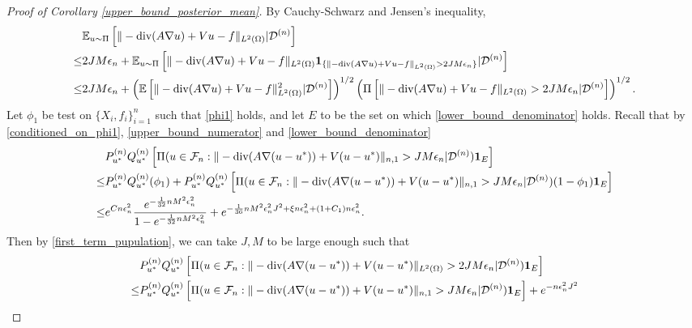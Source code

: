 \documentclass{article}
\newcommand{\E}{\mathbb{E}}
\newcommand{\F}{\mathcal{F}}
\newcommand{\D}{\mathcal{D}}
\renewcommand{\div}{\textnormal{div}}
\theoremstyle{plain}
\theoremstyle{definition}
\theoremstyle{remark}
\begin{document}
\begin{proof}[Proof of Corollary \ref{upper_bound_posterior_mean}]
    By Cauchy-Schwarz and Jensen's inequality, 
    \begin{equation} \label{posterior_mean_upper_bound}
        \begin{aligned}
            & \E_{u \sim \Pi} \left[  \|-\div(A \nabla u) + V u -f\|_{L^2(\Omega)} | \D^{(n)} \right] \\ \leq &  2J M \epsilon_n  + \E_{u \sim \Pi}\left[  \|-\div(A \nabla u) + V u -f\|_{L^2(\Omega)} \mathbf{1}_{\{  \|-\div(A \nabla u) + V u -f\|_{L^2(\Omega)} >2 J M \epsilon_n \}} | \D^{(n)}\right] \\
              \leq & 2J M \epsilon_n + \left(\E \left[ \|-\div(A \nabla u) + V u -f\|_{L^2(\Omega)}^2 | \D^{(n)}\right] \right)^{1/2} \left(\Pi \left[ \|-\div(A \nabla u) + V u -f\|_{L^2(\Omega)} >2 J M \epsilon_n | \D^{(n)} \right]\right)^{1/2}. 
        \end{aligned}
    \end{equation}
    Let $\phi_1$ be test on $\{X_i, f_i\}_{i=1}^n$ such that \eqref{phi1} holds, and let $E$ to be the set on which \eqref{lower_bound_denominator} holds. Recall that by \eqref{conditioned_on_phi1}, \eqref{upper_bound_numerator} and \eqref{lower_bound_denominator} 
    \begin{equation*}
        \begin{aligned}
            & P_{u^*}^{(n)} Q_{u^*}^{(n)} \left[\Pi(u \in \F_n: \|-\div(A \nabla (u-u^*)) + V (u-u^*) \|_{n, 1} >  J M \epsilon_n | \D^{(n)} ) \mathbf{1}_E \right] \\
            \leq &   P_{u^*}^{(n)} Q_{u^*}^{(n)} (\phi_1) + P_{u^*}^{(n)} Q_{u^*}^{(n)} \left[\Pi(u \in \F_n: \|-\div(A \nabla (u-u^*)) + V (u-u^*)\|_{n, 1} >  J M \epsilon_n | \D^{(n)} ) (1 - \phi_1)\mathbf{1}_E \right] \\
            \leq & e^{C n \epsilon_n^2} \frac{e^{-\frac{1}{32}n M^2 \epsilon_n^2}}{1 - e^{-\frac{1}{32}n M^2 \epsilon_n^2}} + e^{-\frac{1}{36} n M^2 \epsilon_{n}^2 J^2 + \xi n\epsilon_n^2 + (1+C_1) n \epsilon_n^2}. 
        \end{aligned}
    \end{equation*}
    Then by \eqref{first_term_pupulation}, we can take $J, M$ to be large enough such that 
    \begin{equation}
    \begin{aligned}
        & P_{u^*}^{(n)} Q_{u^*}^{(n)} \left[\Pi(u \in \F_n: \|-\div(A \nabla (u-u^*)) + V (u-u^*) \|_{L^2(\Omega)} > 2 J M \epsilon_n| \D^{(n)}) \mathbf{1}_E \right] \\
        \leq & P_{u^*}^{(n)} Q_{u^*}^{(n)} \left[\Pi(u \in \F_n: \|-\div(A \nabla (u-u^*)) + V (u-u^*) \|_{n, 1} >  J M \epsilon_n | \D^{(n)} ) \mathbf{1}_E \right] + e^{-  n\epsilon_n^2 J^2} \\

\end{aligned}
\end{equation}
\end{proof}
\end{document}

